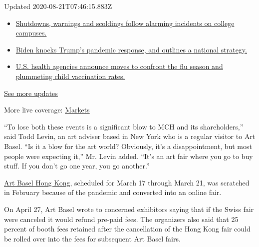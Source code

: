 Updated 2020-08-21T07:46:15.883Z

\begin{itemize}
\tightlist
\item
  \href{https://www.nytimes3xbfgragh.onion/2020/08/20/world/coronavirus-covid.html?action=click\&pgtype=Article\&state=default\&region=MAIN_CONTENT_1\&context=storylines_live_updates\#link-68774d88}{Shutdowns,
  warnings and scoldings follow alarming incidents on college campuses.}
\item
  \href{https://www.nytimes3xbfgragh.onion/2020/08/20/world/coronavirus-covid.html?action=click\&pgtype=Article\&state=default\&region=MAIN_CONTENT_1\&context=storylines_live_updates\#link-26b58724}{Biden
  knocks Trump's pandemic response, and outlines a national strategy.}
\item
  \href{https://www.nytimes3xbfgragh.onion/2020/08/20/world/coronavirus-covid.html?action=click\&pgtype=Article\&state=default\&region=MAIN_CONTENT_1\&context=storylines_live_updates\#link-4e542da3}{U.S.
  health agencies announce moves to confront the flu season and
  plummeting child vaccination rates.}
\end{itemize}

\href{https://www.nytimes3xbfgragh.onion/2020/08/20/world/coronavirus-covid.html?action=click\&pgtype=Article\&state=default\&region=MAIN_CONTENT_1\&context=storylines_live_updates}{See
more updates}

More live coverage:
\href{https://www.nytimes3xbfgragh.onion/live/2020/08/20/business/stock-market-today-coronavirus?action=click\&pgtype=Article\&state=default\&region=MAIN_CONTENT_1\&context=storylines_live_updates}{Markets}

``To lose both these events is a significant blow to MCH and its
shareholders,'' said Todd Levin, an art adviser based in New York who is
a regular visitor to Art Basel. ``Is it a blow for the art world?
Obviously, it's a disappointment, but most people were expecting it,''
Mr. Levin added. ``It's an art fair where you go to buy stuff. If you
don't go one year, you go another.''

\href{https://www.nytimes3xbfgragh.onion/2020/02/06/arts/design/art-basel-cancels-hong-kong-fair.html}{Art
Basel Hong Kong}, scheduled for March 17 through March 21, was scratched
in February because of the pandemic and converted into an online fair.

On April 27, Art Basel wrote to concerned exhibitors saying that if the
Swiss fair were canceled it would refund pre-paid fees. The organizers
also said that 25 percent of booth fees retained after the cancellation
of the Hong Kong fair could be rolled over into the fees for subsequent
Art Basel fairs.

